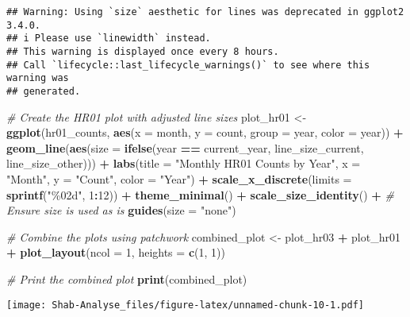 \documentclass[
]{article}
\newenvironment{Shaded}{\begin{snugshade}}{\end{snugshade}}
\newcommand{\AttributeTok}[1]{\textcolor[rgb]{0.13,0.29,0.53}{#1}}
\newcommand{\CommentTok}[1]{\textcolor[rgb]{0.56,0.35,0.01}{\textit{#1}}}
\newcommand{\DecValTok}[1]{\textcolor[rgb]{0.00,0.00,0.81}{#1}}
\newcommand{\FunctionTok}[1]{\textcolor[rgb]{0.13,0.29,0.53}{\textbf{#1}}}
\newcommand{\NormalTok}[1]{#1}
\newcommand{\OtherTok}[1]{\textcolor[rgb]{0.56,0.35,0.01}{#1}}
\newcommand{\SpecialCharTok}[1]{\textcolor[rgb]{0.81,0.36,0.00}{\textbf{#1}}}
\newcommand{\StringTok}[1]{\textcolor[rgb]{0.31,0.60,0.02}{#1}}
\begin{document}
\begin{verbatim}
## Warning: Using `size` aesthetic for lines was deprecated in ggplot2 3.4.0.
## i Please use `linewidth` instead.
## This warning is displayed once every 8 hours.
## Call `lifecycle::last_lifecycle_warnings()` to see where this warning was
## generated.
\end{verbatim}

\begin{Shaded}
\begin{Highlighting}[]
\CommentTok{\# Create the HR01 plot with adjusted line sizes}
\NormalTok{plot\_hr01 }\OtherTok{\textless{}{-}} \FunctionTok{ggplot}\NormalTok{(hr01\_counts, }\FunctionTok{aes}\NormalTok{(}\AttributeTok{x =}\NormalTok{ month, }\AttributeTok{y =}\NormalTok{ count, }\AttributeTok{group =}\NormalTok{ year, }\AttributeTok{color =}\NormalTok{ year)) }\SpecialCharTok{+}
  \FunctionTok{geom\_line}\NormalTok{(}\FunctionTok{aes}\NormalTok{(}\AttributeTok{size =} \FunctionTok{ifelse}\NormalTok{(year }\SpecialCharTok{==}\NormalTok{ current\_year, line\_size\_current, line\_size\_other))) }\SpecialCharTok{+}
  \FunctionTok{labs}\NormalTok{(}\AttributeTok{title =} \StringTok{"Monthly HR01 Counts by Year"}\NormalTok{,}
       \AttributeTok{x =} \StringTok{"Month"}\NormalTok{,}
       \AttributeTok{y =} \StringTok{"Count"}\NormalTok{,}
       \AttributeTok{color =} \StringTok{"Year"}\NormalTok{) }\SpecialCharTok{+}
  \FunctionTok{scale\_x\_discrete}\NormalTok{(}\AttributeTok{limits =} \FunctionTok{sprintf}\NormalTok{(}\StringTok{"\%02d"}\NormalTok{, }\DecValTok{1}\SpecialCharTok{:}\DecValTok{12}\NormalTok{)) }\SpecialCharTok{+}
  \FunctionTok{theme\_minimal}\NormalTok{() }\SpecialCharTok{+}
  \FunctionTok{scale\_size\_identity}\NormalTok{() }\SpecialCharTok{+}  \CommentTok{\# Ensure size is used as is}
  \FunctionTok{guides}\NormalTok{(}\AttributeTok{size =} \StringTok{"none"}\NormalTok{)}

\CommentTok{\# Combine the plots using patchwork}
\NormalTok{combined\_plot }\OtherTok{\textless{}{-}}\NormalTok{ plot\_hr03 }\SpecialCharTok{+}\NormalTok{ plot\_hr01 }\SpecialCharTok{+} \FunctionTok{plot\_layout}\NormalTok{(}\AttributeTok{ncol =} \DecValTok{1}\NormalTok{, }\AttributeTok{heights =} \FunctionTok{c}\NormalTok{(}\DecValTok{1}\NormalTok{, }\DecValTok{1}\NormalTok{))}

\CommentTok{\# Print the combined plot}
\FunctionTok{print}\NormalTok{(combined\_plot)}
\end{Highlighting}
\end{Shaded}

\texttt{[image: Shab-Analyse\_files/figure-latex/unnamed-chunk-10-1.pdf]}
\end{document}
